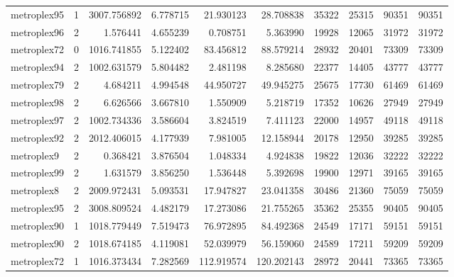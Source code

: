 \begin{longtable}{|l|r|r|r|r|r|r|r|r|r|}
metroplex95 & 1 & 3007.756892 & 6.778715 & 21.930123 & 28.708838 & 35322 & 25315 & 90351 & 90351 \\
metroplex96 & 2 & 1.576441 & 4.655239 & 0.708751 & 5.363990 & 19928 & 12065 & 31972 & 31972 \\
metroplex72 & 0 & 1016.741855 & 5.122402 & 83.456812 & 88.579214 & 28932 & 20401 & 73309 & 73309 \\
metroplex94 & 2 & 1002.631579 & 5.804482 & 2.481198 & 8.285680 & 22377 & 14405 & 43777 & 43777 \\
metroplex79 & 2 & 4.684211 & 4.994548 & 44.950727 & 49.945275 & 25675 & 17730 & 61469 & 61469 \\
metroplex98 & 2 & 6.626566 & 3.667810 & 1.550909 & 5.218719 & 17352 & 10626 & 27949 & 27949 \\
metroplex97 & 2 & 1002.734336 & 3.586604 & 3.824519 & 7.411123 & 22000 & 14957 & 49118 & 49118 \\
metroplex92 & 2 & 2012.406015 & 4.177939 & 7.981005 & 12.158944 & 20178 & 12950 & 39285 & 39285 \\
metroplex9 & 2 & 0.368421 & 3.876504 & 1.048334 & 4.924838 & 19822 & 12036 & 32222 & 32222 \\
metroplex99 & 2 & 1.631579 & 3.856250 & 1.536448 & 5.392698 & 19900 & 12971 & 39165 & 39165 \\
metroplex8 & 2 & 2009.972431 & 5.093531 & 17.947827 & 23.041358 & 30486 & 21360 & 75059 & 75059 \\
metroplex95 & 2 & 3008.809524 & 4.482179 & 17.273086 & 21.755265 & 35362 & 25355 & 90405 & 90405 \\
metroplex90 & 1 & 1018.779449 & 7.519473 & 76.972895 & 84.492368 & 24549 & 17171 & 59151 & 59151 \\
metroplex90 & 2 & 1018.674185 & 4.119081 & 52.039979 & 56.159060 & 24589 & 17211 & 59209 & 59209 \\
metroplex72 & 1 & 1016.373434 & 7.282569 & 112.919574 & 120.202143 & 28972 & 20441 & 73365 & 73365 \\
\end{longtable}
